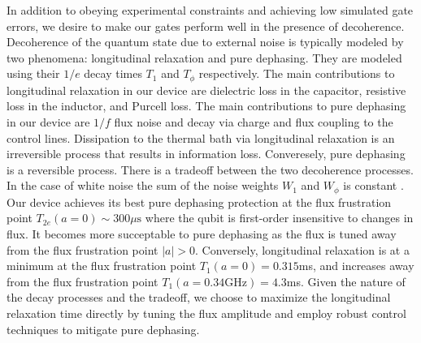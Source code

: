 In addition to obeying experimental constraints
and achieving low simulated gate errors, we desire
to make our gates perform well in the presence of decoherence.
Decoherence of the quantum state due to external noise
is typically modeled by two phenomena: longitudinal relaxation and pure dephasing.
They are modeled using their $1/e$ decay times $T_{1}$ and $T_{\phi}$ respectively.
The main contributions to longitudinal relaxation in our
device are dielectric loss in the capacitor, resistive loss in the inductor,
and Purcell loss. The main contributions to pure dephasing in our
device are $1/f$ flux noise and decay via charge and flux coupling
to the control lines.
Dissipation to the thermal bath via longitudinal
relaxation is an irreversible process
that results in information loss.
Converesely, pure dephasing is a reversible process.
There is a tradeoff between the two decoherence processes. In the case of white
noise the sum of the noise weights $W_{1}$ and $W_{\phi}$
is constant \cite{huang2020engineering}.
Our device achieves its best pure dephasing
protection at the flux frustration point
$T_{2e}(a = 0) \sim 300 \mu\textrm{s}$
where the qubit is first-order insensitive to changes in flux.
It becomes more succeptable to pure dephasing as the flux is tuned away from the flux
frustration point $|a| > 0$. Conversely, longitudinal relaxation is at a minimum
at the flux frustration point $T_{1}(a = 0) = 0.315$ms,
and increases away from the flux frustration point
$T_{1}(a = 0.34 \textrm{GHz}) = 4.3$ms. Given the nature
of the decay processes and the tradeoff, we choose
to maximize the longitudinal relaxation time directly
by tuning the flux amplitude and employ robust control techniques to mitigate
pure dephasing.

